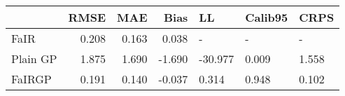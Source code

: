 \begin{tabular}{lrrrlll}
\toprule
{} &   RMSE &    MAE &   Bias &      LL & Calib95 &   CRPS \\
\midrule
FaIR     &  0.208 &  0.163 &  0.038 &       - &       - &      - \\
Plain GP &  1.875 &  1.690 & -1.690 & -30.977 &   0.009 &  1.558 \\
FaIRGP   &  0.191 &  0.140 & -0.037 &   0.314 &   0.948 &  0.102 \\
\bottomrule
\end{tabular}
